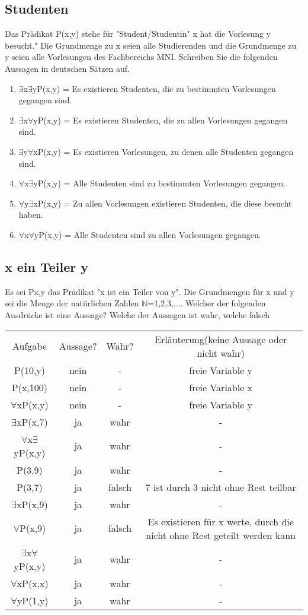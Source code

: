 {\subsection{Studenten}
Das Prädikat P(x,y) stehe für "Student/Studentin" x hat die Vorlesung y 
besucht." Die Grundmenge zu x seien alle Studierenden und die Grundmenge
zu y seien alle Vorlesungen des Fachbereichs MNI. Schreiben Sie die
folgenden Aussagen in deutschen Sätzen auf.
\begin{enumerate}
    \item $\exists$x$\exists$yP(x,y) = Es existieren Studenten, die zu
    bestimmten Vorlesungen gegangen sind.
    \item $\exists$x$\forall$yP(x,y) = Es existieren Studenten, die zu
    allen Vorlesungen gegangen sind.
    \item $\exists$y$\forall$xP(x,y) = Es existieren Vorlesungen, zu
    denen alle Studenten gegangen sind.
    \item $\forall$x$\exists$yP(x,y) = Alle Studenten sind zu bestimmten
    Vorlesungen gegangen.
    \item $\forall$y$\exists$xP(x,y) = Zu allen Vorlesungen existieren
    Studenten, die diese besucht haben.
    \item $\forall$x$\forall$yP(x,y) = Alle Studenten sind zu allen
    Vorlesungen gegangen.
\end{enumerate}
\subsection{x ein Teiler y}
Es sei P{x,y} das Prädikat "x ist ein Teiler von y". Die Grundmengen für x und
y sei die Menge der natürlichen Zahlen $\mathbb{N}$={1,2,3,...}. Welcher der
folgenden Ausdrücke ist eine Aussage? Welche der Aussagen ist wahr, welche
falsch\\
{
    \tiny
    \begin{tabular}{cccc}
        Aufgabe & Aussage? & Wahr? & 
        Erläuterung(keine Aussage oder nicht wahr)\\
        P(10,y) & nein & - & freie Variable y\\
        P(x,100) & nein & - & freie Variable x\\
        $\forall$xP(x,y) &  nein & - & freie Variable y\\
        $\exists$xP(x,7) & ja & wahr & -\\
        $\forall$x$\exists$yP(x,y) & ja & wahr & -\\
        P(3,9) & ja & wahr & -\\
        P(3,7) & ja & falsch & 7 ist durch 3 nicht ohne Rest teilbar\\
        $\exists$xP(x,9) & ja & wahr & -\\
        $\forall$P(x,9) & ja & falsch & Es existieren für x werte, durch die
        nicht ohne Rest geteilt werden kann\\
        $\exists$x$\forall$yP(x,y) & ja & wahr & -\\
        $\forall$xP(x,x) & ja & wahr & -\\
        $\forall$yP(1,y) & ja & wahr & -
    \end{tabular}
}
}%
